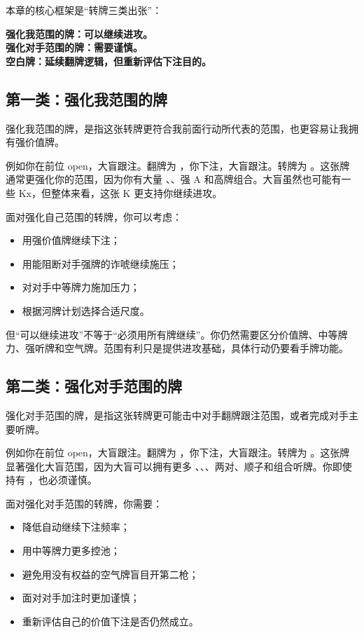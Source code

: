 本章的核心框架是“转牌三类出张”：

\begin{center}
\textbf{强化我范围的牌：可以继续进攻。\\
强化对手范围的牌：需要谨慎。\\
空白牌：延续翻牌逻辑，但重新评估下注目的。}
\end{center}

\subsection{第一类：强化我范围的牌}

强化我范围的牌，是指这张转牌更符合我前面行动所代表的范围，也更容易让我拥有强价值牌。

例如你在前位 open，大盲跟注。翻牌为 ，你下注，大盲跟注。转牌为 。这张牌通常更强化你的范围，因为你有大量 、、强 A 和高牌组合。大盲虽然也可能有一些 Kx，但整体来看，这张 K 更支持你继续进攻。

面对强化自己范围的转牌，你可以考虑：

\begin{itemize}
\item 用强价值牌继续下注；
\item 用能阻断对手强牌的诈唬继续施压；
\item 对对手中等牌力施加压力；
\item 根据河牌计划选择合适尺度。
\end{itemize}

但“可以继续进攻”不等于“必须用所有牌继续”。你仍然需要区分价值牌、中等牌力、强听牌和空气牌。范围有利只是提供进攻基础，具体行动仍要看手牌功能。

\subsection{第二类：强化对手范围的牌}

强化对手范围的牌，是指这张转牌更可能击中对手翻牌跟注范围，或者完成对手主要听牌。

例如你在前位 open，大盲跟注。翻牌为 ，你下注，大盲跟注。转牌为 。这张牌显著强化大盲范围，因为大盲可以拥有更多 、、、两对、顺子和组合听牌。你即使持有 ，也必须谨慎。

面对强化对手范围的转牌，你需要：

\begin{itemize}
\item 降低自动继续下注频率；
\item 用中等牌力更多控池；
\item 避免用没有权益的空气牌盲目开第二枪；
\item 面对对手加注时更加谨慎；
\item 重新评估自己的价值下注是否仍然成立。
\end{itemize}

